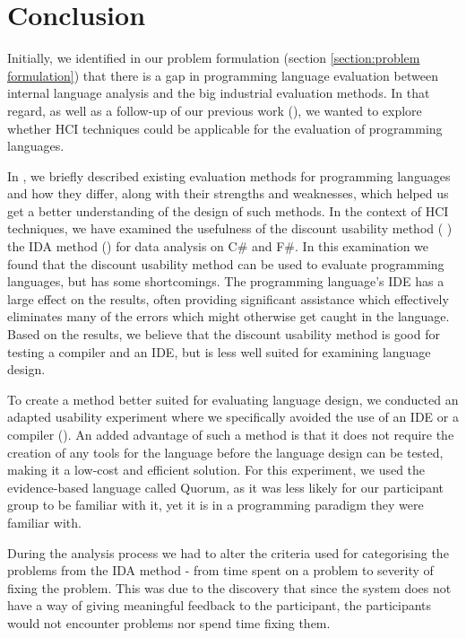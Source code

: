 \chapter{Conclusion}
\label{chap:conclusion}

Initially, we identified in our problem formulation (section \ref{section:problem formulation}) that there is a gap in programming language evaluation between internal language analysis and the big industrial evaluation methods. In that regard, as well as a follow-up of our previous work (), we wanted to explore whether HCI techniques could be applicable for the evaluation of programming languages. 

In , we briefly described existing evaluation methods for programming languages and how they differ, along with their strengths and weaknesses, which helped us get a better understanding of the design of such methods.
In the context of HCI techniques, we have examined the usefulness of the discount usability method ( ) the IDA method () for data analysis on C\# and F\#.
In this examination we found that the discount usability method can be used to evaluate programming languages, but has some shortcomings.
The programming language’s IDE has a large effect on the results, often providing significant assistance which effectively eliminates many of the errors which might otherwise get caught in the language.
Based on the results, we believe that the discount usability method is good for testing a compiler and an IDE, but is less well suited for examining language design.

To create a method better suited for evaluating language design, we conducted an adapted usability experiment where we specifically avoided the use of an IDE or a compiler ().
An added advantage of such a method is that it does not require the creation of any tools for the language before the language design can be tested, making it a low-cost and efficient solution. 
For this experiment, we used the evidence-based language called Quorum, as it was less likely for our participant group to be familiar with it, yet it is in a programming paradigm they were familiar with. 

During the analysis process we had to alter the criteria used for categorising the problems from the IDA method - from time spent on a problem to severity of fixing the problem.
This was due to the discovery that since the system does not have a way of giving meaningful feedback to the participant, the participants would not encounter problems nor spend time fixing them.

